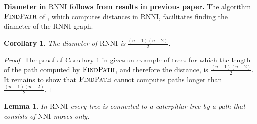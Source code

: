 \documentclass[11pt]{amsart}
\newtheorem{lemma}{Lemma}
\newtheorem{corollary}{Corollary}
\newcommand{\rnni}{\mathrm{RNNI}}
\newcommand{\findpath}{\textsc{FindPath}}
\newcommand{\nni}{\mathrm{NNI}}
\newcommand{\summary}[1]{\textbf{#1}} %
\begin{document}
\summary{Diameter in $\rnni$ follows from results in previous paper.}
The algorithm $\findpath$ of \autocite{collienne2020computing}, which computes distances in $\rnni$, facilitates finding the diameter of the $\rnni$ graph. 
\begin{corollary}
	The diameter of $\rnni$ is $\frac{(n-1)(n-2)}{2}$.
	\label{cor:diameter_rnni}
\end{corollary}

\begin{proof}
	The proof of Corollary 1 in \autocite{collienne2020computing} gives an example of trees for which the length of the path computed by $\findpath$, and therefore the distance, is $\frac{(n-1)(n-2)}{2}$.
	It remains to show that $\findpath$ cannot computes paths longer than $\frac{(n-1)(n-2)}{2}$.
\end{proof}

\begin{lemma}
	In $\rnni$ every tree is connected to a caterpillar tree by a path that consists of $\nni$ moves only.
	\label{lemma:nni_path_to_caterpillar}
\end{lemma}
\end{document}

